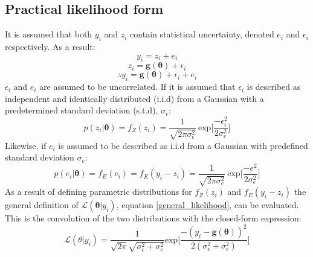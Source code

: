 \subsection{Practical likelihood form}
It is assumed that both $y_i$ and $z_i$ contain statistical uncertainty, denoted $e_i$ and $\epsilon_i$ respectively. As a result: 
\begin{equation}
y_i = z_i + e_i
\end{equation}
\begin{equation}
z_i = \bm{g}(\bm{\theta}) + \epsilon_i
\end{equation}	
\begin{equation}
\therefore	y_i = \bm{g}(\bm{\theta}) + \epsilon_i + e_i
\end{equation}
$\epsilon_i$ and $e_i$ are assumed to be uncorrelated. If it is assumed that $\epsilon_i$ is described as independent and identically distributed (i.i.d) from a Gaussian with a predetermined standard deviation (s.t.d), $\sigma_{\epsilon}$:
\begin{equation}
p(z_i|\bm{\theta}) = f_Z(z_i) = \frac{1}{\sqrt{2\pi\sigma_{\epsilon}^2}}\ \text{exp}\bigg[\frac{-\epsilon_i^2}{2\sigma_{\epsilon}^2} \bigg]
\end{equation} 
Likewise, if $e_i$ is assumed to be described as i.i.d from a Gaussian with predefined standard deviation $\sigma_{e}$:
\begin{equation}
p(e_i|\bm{\theta}) = f_E(e_i) = f_E(y_i-z_i) = \frac{1}{\sqrt{2\pi\sigma_{e}^2}}\ \text{exp}\bigg[\frac{-e^2}{2\sigma_{e}^2} \bigg]
\end{equation}
As a result of defining parametric distributions for $f_Z(z_i)$ and $f_E(y_i-z_i)$ the general definition of $\mathcal{L}(\bm{\theta}|y_i)$, equation \ref{general_likelihood}, can be evaluated. This is the convolution of the two distributions with the closed-form expression:
\begin{equation}
\mathcal{L}(\theta|y_i) = \frac{1}{\sqrt{2\pi}\sqrt{\sigma_{\epsilon}^2+\sigma_{e}^2}} \text{exp}\bigg[\frac{-(y_i-\bm{g}(\bm{\theta}))^2}{2(\sigma_{\epsilon}^2+\sigma_{e}^2)}\bigg]
\end{equation}

